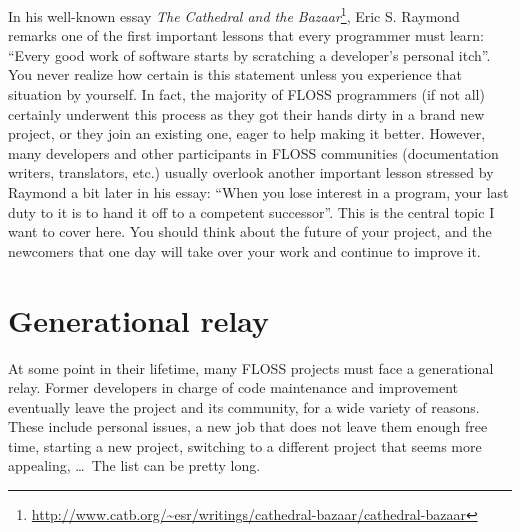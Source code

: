 

In his well-known essay \textit{The Cathedral and the
Bazaar}\footnote{\url{
http://www.catb.org/~esr/writings/cathedral-bazaar/cathedral-bazaar}}, Eric S.
Raymond remarks one of the first important lessons that every programmer must
learn: ``Every good work of software starts by scratching a developer's personal
itch''. You never realize how certain is this statement unless you experience
that situation by yourself. In fact, the majority of FLOSS programmers (if not
all) certainly underwent this process as they got their hands dirty in a brand
new project, or they join an existing one, eager to help making it better.
However, many developers and other participants in FLOSS communities
(documentation writers, translators, etc.) usually overlook another important
lesson stressed by Raymond a bit later in his essay: ``When you lose interest in
a program, your last duty to it is to hand it off to a competent successor''.
This is the central topic I want to cover here. You should think about the
future of your project, and the newcomers that one day will take over your work
and continue to improve it.

\section*{Generational relay}

At some point in their lifetime, many FLOSS projects must face a generational
relay. Former developers in charge of code maintenance and improvement
eventually leave the project and its community, for a wide variety of reasons.
These include personal issues, a new job that does not leave them enough free
time, starting a new project, switching to a different project that seems more
appealing, \dots\ The list can be pretty long.

